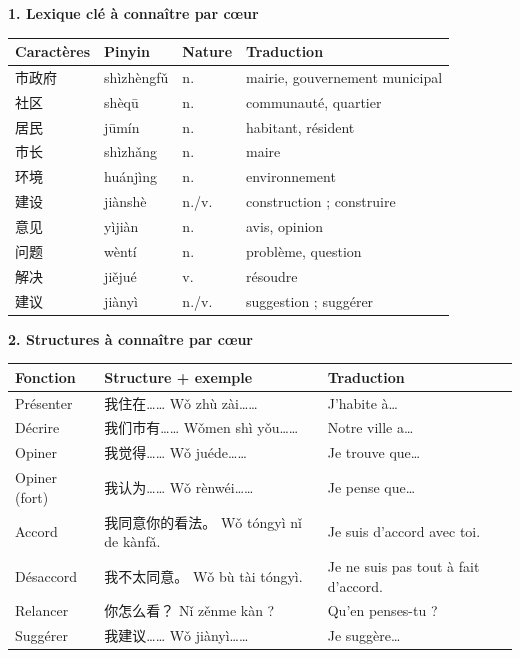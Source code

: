 \documentclass[11pt]{article}
\begin{document}
\begin{bilan}
\textbf{1. Lexique clé à connaître par cœur}
\begin{center}
\begin{tabularx}{\linewidth}{|X|X|X|X|}\hline
\rowcolor{popblueL} Caractères & Pinyin & Nature & Traduction \\ \hline
市政府 & shìzhèngfǔ & n. & mairie, gouvernement municipal \\ \hline
社区 & shèqū & n. & communauté, quartier \\ \hline
居民 & jūmín & n. & habitant, résident \\ \hline
市长 & shìzhǎng & n. & maire \\ \hline
环境 & huánjìng & n. & environnement \\ \hline
建设 & jiànshè & n./v. & construction ; construire \\ \hline
意见 & yìjiàn & n. & avis, opinion \\ \hline
问题 & wèntí & n. & problème, question \\ \hline
解决 & jiějué & v. & résoudre \\ \hline
建议 & jiànyì & n./v. & suggestion ; suggérer \\ \hline
\end{tabularx}
\end{center}

\textbf{2. Structures à connaître par cœur}
\begin{center}
\begin{tabularx}{\linewidth}{|X|X|X|}\hline
\rowcolor{popblueL} Fonction & Structure + exemple & Traduction \\ \hline
Présenter & 我住在…… Wǒ zhù zài…… & J'habite à… \\ \hline
Décrire & 我们市有…… Wǒmen shì yǒu…… & Notre ville a… \\ \hline
Opiner & 我觉得…… Wǒ juéde…… & Je trouve que… \\ \hline
Opiner (fort) & 我认为…… Wǒ rènwéi…… & Je pense que… \\ \hline
Accord & 我同意你的看法。 Wǒ tóngyì nǐ de kànfǎ. & Je suis d'accord avec toi. \\ \hline
Désaccord & 我不太同意。 Wǒ bù tài tóngyì. & Je ne suis pas tout à fait d'accord. \\ \hline
Relancer & 你怎么看？ Nǐ zěnme kàn ? & Qu'en penses-tu ? \\ \hline
Suggérer & 我建议…… Wǒ jiànyì…… & Je suggère… \\ \hline
\end{tabularx}
\end{center}


\end{bilan}
\end{document}
